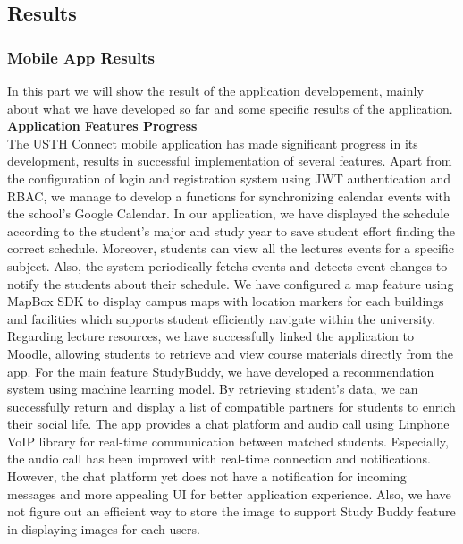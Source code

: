 \documentclass[12pt]{article}
\begin{document}
\subsection{Results}

\subsubsection{Mobile App Results}
In this part we will show the result of the application developement, mainly about what we have developed so far and some specific results of the application. \\

\textbf{Application Features Progress} \\

The USTH Connect mobile application has made significant progress in its development, results in successful implementation of several features.
Apart from the configuration of login and registration system using JWT authentication and RBAC, we manage to develop a functions for synchronizing calendar events with the school's Google Calendar.
In our application, we have displayed the schedule according to the student's major and study year to save student effort finding the correct schedule. 
Moreover, students can view all the lectures events for a specific subject. Also, the system periodically fetchs events and detects event changes to notify the students about their schedule.
We have configured a map feature using MapBox SDK to display campus maps with location markers for each buildings and facilities which supports student efficiently navigate within the university.
Regarding lecture resources, we have successfully linked the application to Moodle, allowing students to retrieve and view course materials directly from the app.
For the main feature StudyBuddy, we have developed a recommendation system using machine learning model. By retrieving student's data, we can successfully return and display a list of compatible partners for students to enrich their social life.
The app provides a chat platform and audio call using Linphone VoIP library for real-time communication between matched students. Especially, the audio call has been improved with real-time connection and notifications. 
However, the chat platform yet does not have a notification for incoming messages and more appealing UI for better application experience.
Also, we have not figure out an efficient way to store the image to support Study Buddy feature in displaying images for each users. \\
\end{document}
